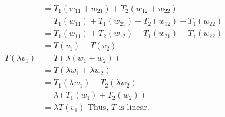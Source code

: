 \documentclass{article}
\begin{document}
\begin{itemize}
\begin{itemize}
\begin{align*}
                                &= T_1(w_{11}+w_{21})+T_2(w_{12}+w_{22})\\
                                &=T_1(w_{11})+T_1(w_{21})+T_2(w_{12})+T_1(w_{22})\\
                                &=T_1(w_{11})+T_2(w_{12})+T_1(w_{21})+T_1(w_{22})\\
                                &=T(v_1)+T(v_2)\\
                    T(\lambda v_1)& = T(\lambda(w_1+w_2))\\
                                &= T(\lambda w_1+\lambda w_2)\\
                                &=T_1(\lambda w_1)+T_2(\lambda w_2)\\
                                &=\lambda (T_1( w_1)+T_2(w_2))\\
                                &= \lambda T(v_1) \text{ \ \ \ \ Thus, \(T\) is linear.}
                \end{align*}
                

\end{itemize}
\end{itemize}
\end{document}
